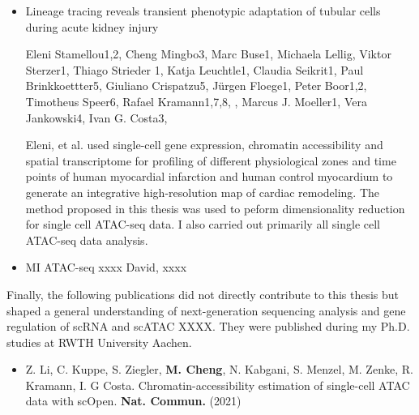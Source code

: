 \begin{addmargin}{0.02\textwidth}
	\begin{itemize}
	\item Lineage tracing reveals transient phenotypic adaptation of tubular cells during acute kidney injury

        Eleni Stamellou1,2, Cheng Mingbo3, Marc Buse1, Michaela Lellig, Viktor Sterzer1, Thiago Strieder 1, Katja Leuchtle1, Claudia Seikrit1, Paul Brinkkoettter5, Giuliano Crispatzu5, Jürgen Floege1, Peter Boor1,2, Timotheus Speer6, Rafael Kramann1,7,8, , Marcus J. Moeller1, Vera Jankowski4, Ivan G. Costa3,

		Eleni, et al. used single-cell gene expression, chromatin accessibility and spatial transcriptome for profiling of different physiological zones and time points of human myocardial infarction and human control myocardium to generate an integrative high-resolution map of cardiac remodeling. The method proposed in this thesis was used to peform dimensionality reduction for single cell ATAC-seq data. I also carried out primarily all single cell ATAC-seq data analysis.  \\
	\end{itemize}
\end{addmargin}

\begin{addmargin}{0.02\textwidth}
	\begin{itemize}
	\item MI ATAC-seq xxxx
	David, xxxx
	\end{itemize}
\end{addmargin}



Finally, the following publications did not directly contribute to this thesis but shaped a general
understanding of next-generation sequencing analysis and gene regulation of scRNA and scATAC XXXX. They were
published during my Ph.D. studies at RWTH University Aachen.

\begin{addmargin}{0.02\textwidth}
	\begin{itemize}
	\item Z. Li, C. Kuppe, S. Ziegler, \textbf{M. Cheng}, N. Kabgani, S. Menzel, M. Zenke, R. Kramann, I. G Costa. Chromatin-accessibility estimation of single-cell ATAC data with scOpen. \textbf{Nat. Commun.} (2021)\\
	\end{itemize}
\end{addmargin}

